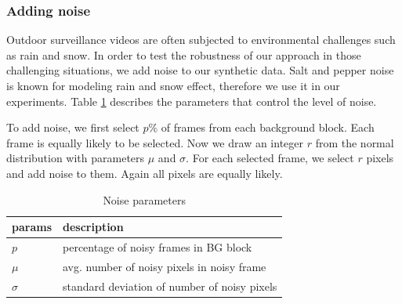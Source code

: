 \subsubsection{Adding noise}
Outdoor surveillance videos are often subjected to environmental challenges such as rain and snow. In order to test the robustness of our approach in those challenging situations, we add noise to our synthetic data. Salt and pepper noise \cite{marques2011practical} is known for modeling rain and snow effect, therefore we use it in our experiments. 
Table \ref{table:noise-params} describes the parameters that control the level of noise. 

To add noise, we first select $p\%$ of frames from each background block. Each frame is equally likely to be selected. Now we draw an integer $r$ from the normal distribution with parameters $\mu$ and $\sigma$. For each selected frame, we select $r$ pixels and add noise to them. Again all pixels are equally likely. 

\begin{table}
\centering
\caption{Noise parameters}  \vspace{5pt}
\label{table:noise-params}
\begin{tabular}{|l|l|}
\hline
params & description                              \\ \hline \hline
$p$          & percentage of noisy frames in BG block  \\ \hline
$\mu$        & avg. number of noisy pixels in noisy frame     \\ \hline
$\sigma$     & standard deviation of number of noisy pixels     \\ \hline
\end{tabular}
\end{table}

